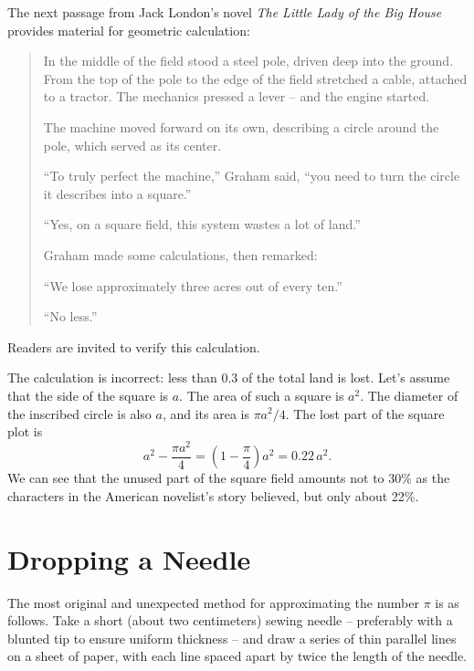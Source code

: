 The next passage from Jack London's novel \emph{The Little Lady of the Big House} provides material for geometric calculation:
\begin{quote}
In the middle of the field stood a steel pole, driven deep into the ground. From the top of the pole to the edge of the field stretched a cable, attached to a tractor. The mechanics pressed a lever -- and the engine started.

The machine moved forward on its own, describing a circle around the pole, which served as its center.

``To truly perfect the machine,'' Graham said, ``you need to turn the circle it describes into a square.''

``Yes, on a square field, this system wastes a lot of land.''

Graham made some calculations, then remarked:

``We lose approximately three acres out of every ten.''

``No less.''
\end{quote}

Readers are invited to verify this calculation.

\ans The calculation is incorrect: less than 0.3 of the total land is lost. Let's assume that the side of the square is $a$. The area of such a square is $a^{2}$. The diameter of the inscribed circle is also $a$, and its area is $\pi a^{2}/4$. The lost part of the square plot is
\begin{equation*}%
a^{2} - \frac{\pi a^2}{4} = \left(1 - \frac{\pi}{4} \right) a^{2}= 0.22 \, a^{2}.
\end{equation*}
We can see that the unused part of the square field amounts not to 30\% as the characters in the American novelist's story believed, but only about 22\%.


\section{Dropping a Needle}
\label{sec-9.4}


The most original and unexpected method for approximating the number $\pi$ is as follows. Take a short (about two centimeters) sewing needle -- preferably with a blunted tip to ensure uniform thickness -- and draw a series of thin parallel lines on a sheet of paper, with each line spaced apart by twice the length of the needle.

